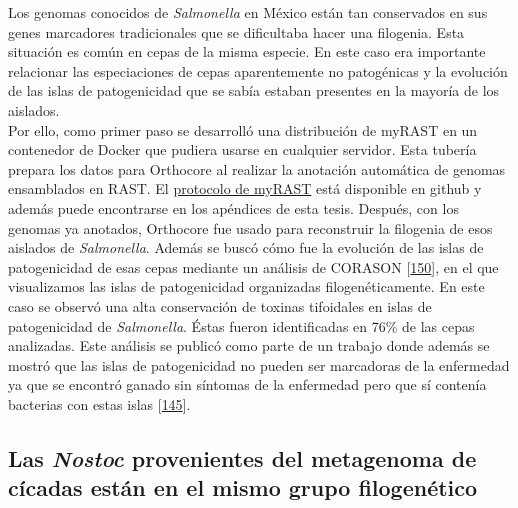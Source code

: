 \documentclass[12pt,twoside]{reedthesis}
\begin{document}
  Los genomas conocidos de \emph{Salmonella} en México están tan
  conservados en sus genes marcadores tradicionales que se dificultaba
  hacer una filogenia. Esta situación es común en cepas de la misma
  especie. En este caso era importante relacionar las especiaciones de
  cepas aparentemente no patogénicas y la evolución de las islas de
  patogenicidad que se sabía estaban presentes en la mayoría de los
  aislados.\\
  Por ello, como primer paso se desarrolló una distribución de myRAST en
  un contenedor de Docker que pudiera usarse en cualquier servidor. Esta
  tubería prepara los datos para Orthocore al realizar la anotación
  automática de genomas ensamblados en RAST. El
  \href{https://github.com/nselem/myrast}{protocolo de myRAST} está
  disponible en github y además puede encontrarse en los apéndices de esta
  tesis. Después, con los genomas ya anotados, Orthocore fue usado para
  reconstruir la filogenia de esos aislados de \emph{Salmonella}. Además
  se buscó cómo fue la evolución de las islas de patogenicidad de esas
  cepas mediante un análisis de CORASON
  {[}\protect\hyperlink{ref-navarro-munoz_computational_2018}{150}{]}, en
  el que visualizamos las islas de patogenicidad organizadas
  filogenéticamente. En este caso se observó una alta conservación de
  toxinas tifoidales en islas de patogenicidad de \emph{Salmonella}. Éstas
  fueron identificadas en 76\% de las cepas analizadas. Este análisis se
  publicó como parte de un trabajo donde además se mostró que las islas de
  patogenicidad no pueden ser marcadoras de la enfermedad ya que se
  encontró ganado sin síntomas de la enfermedad pero que sí contenía
  bacterias con estas islas
  {[}\protect\hyperlink{ref-delgado-suarez_whole_2018}{145}{]}.
  
  \subsection{\texorpdfstring{Las \emph{Nostoc} provenientes del
  metagenoma de cícadas están en el mismo grupo
  filogenético}{Las Nostoc provenientes del metagenoma de cícadas están en el mismo grupo filogenético}}\label{las-nostoc-provenientes-del-metagenoma-de-cicadas-estan-en-el-mismo-grupo-filogenetico}
  
\end{document}
